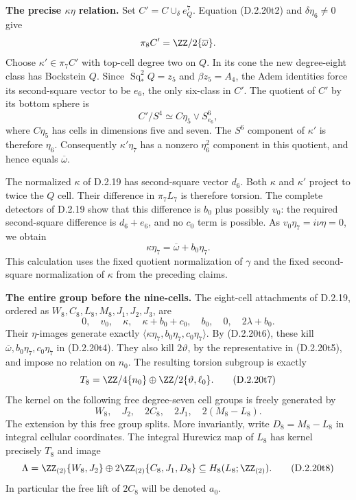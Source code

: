 \medskip\noindent
\textbf{The precise $\kappa\eta$ relation.}
Set $C'=C\cup_\delta e^7_Q$. Equation
\textup{(D.2.20t2)} and $\delta\eta_6\ne0$ give
\[
 \pi_8C'=\ZZ/2\{\overline\omega\}.
\]
Choose $\kappa'\in\pi_7C'$ with top-cell degree two on $Q$.
In its cone the new degree-eight class has Bockstein $Q$.
Since $\operatorname{Sq}_*^2Q=z_5$ and
$\beta z_5=A_4$, the Adem identities force its
second-square vector to be $e_6$, the only six-class in $C'$.
The quotient of $C'$ by its bottom sphere is
\[
 C'/S^4\simeq C\eta_{5}\vee S^6_{e_6},
\]
where $C\eta_5$ has cells in dimensions five and seven.
The $S^6$ component of $\kappa'$ is therefore $\eta_6$.
Consequently $\kappa'\eta_7$ has a nonzero $\eta_6^2$
component in this quotient, and hence equals
$\overline\omega$.

The normalized $\kappa$ of D.2.19 has second-square vector
$d_6$. Both $\kappa$ and $\kappa'$ project to twice the
$Q$ cell. Their difference in $\pi_7L_7$ is therefore
torsion. The complete detectors of D.2.19 show that this
difference is $b_0$ plus possibly $v_0$: the required
second-square difference is $d_6+e_6$, and no $c_0$ term
is possible. As $v_0\eta_7=i\nu\eta=0$, we obtain
\[
 \kappa\eta_7=\overline\omega+b_0\eta_7.
 \tag{D.2.20t6}
\]
This calculation uses the fixed quotient normalization of
$\gamma$ and the fixed second-square normalization of
$\kappa$ from the preceding claims.

\medskip\noindent
\textbf{The entire group before the nine-cells.}
The eight-cell attachments of D.2.19, ordered as
$W_8,C_8,L_8,M_8,J_1,J_2,J_3$, are
\[
 0,\quad v_0,\quad\kappa,\quad
 \kappa+b_0+c_0,\quad b_0,\quad0,\quad2\lambda+b_0.
\]
Their $\eta$-images generate exactly
$\langle\kappa\eta_7,b_0\eta_7,c_0\eta_7\rangle$.
By \textup{(D.2.20t6)}, these kill
$\overline\omega,b_0\eta_7,c_0\eta_7$ in
\textup{(D.2.20t4)}. They also kill $2\vartheta$, by
the representative in \textup{(D.2.20t5)}, and impose
no relation on $n_0$. The resulting torsion subgroup is exactly
\[
 T_8=\ZZ/4\{n_0\}\oplus
        \ZZ/2\{\vartheta,\ell_0\}.
 \tag{D.2.20t7}
\]
The kernel on the following free degree-seven cell groups
is freely generated by
\[
 W_8,\quad J_2,\quad2C_8,\quad2J_1,\quad2(M_8-L_8).
\]
The extension by this free group splits. More invariantly,
write $D_8=M_8-L_8$ in integral cellular coordinates.
The integral Hurewicz map of $L_8$ has kernel precisely
$T_8$ and image
\[
 \Lambda=\ZZ_{(2)}\{W_8,J_2\}
       \oplus2\ZZ_{(2)}\{C_8,J_1,D_8\}
 \subseteq H_8(L_8;\ZZ_{(2)}).
 \tag{D.2.20t8}
\]
In particular the free lift of $2C_8$ will be denoted $a_0$.

